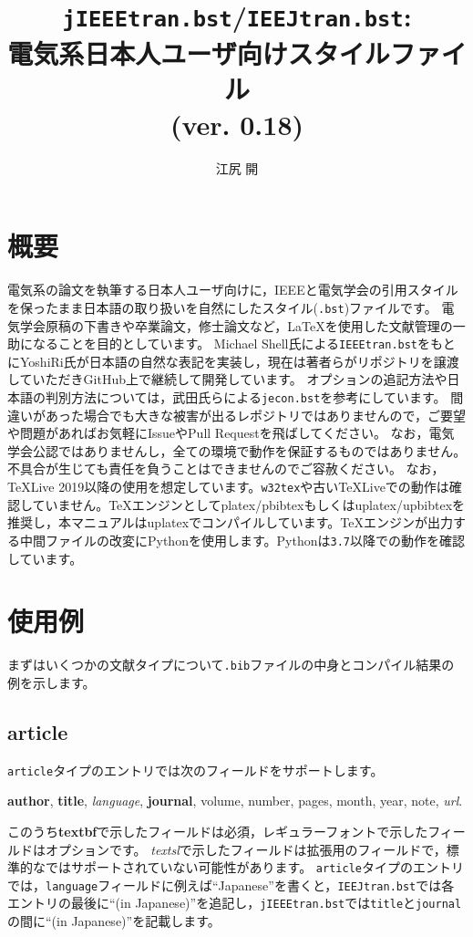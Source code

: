 \documentclass[10pt, a4paper, dvipdfmx, uplatex]{jsarticle} %
\title{\texttt{jIEEEtran.bst}/\texttt{IEEJtran.bst}:\\電気系日本人ユーザ向け\BibTeX スタイルファイル\\(ver. 0.18)}
\author{江尻 開}
\begin{document}
\maketitle
\tableofcontents



\section{概要}
\begin{bibunit}[jIEEEtran]

電気系の論文を執筆する日本人ユーザ向けに，IEEEと電気学会の引用スタイルを保ったまま日本語の取り扱いを自然にした\BibTeX スタイル(\texttt{.bst})ファイルです。
電気学会原稿の下書きや卒業論文，修士論文など，\LaTeX を使用した文献管理の一助になることを目的としています。
Michael Shell氏による\texttt{IEEEtran.bst}\cite{IEEEtran}をもとにYoshiRi氏が日本語の自然な表記を実装し，現在は著者らがリポジトリを譲渡していただきGitHub上\cite{jIEEEtran}で継続して開発しています。
オプションの追記方法や日本語の判別方法については，武田氏らによる\texttt{jecon.bst}\cite{jeconbst}を参考にしています。
間違いがあった場合でも大きな被害が出るレポジトリではありませんので，ご要望や問題があればお気軽にIssueやPull Requestを飛ばしてください。
なお，電気学会公認ではありませんし，全ての環境で動作を保証するものではありません。不具合が生じても責任を負うことはできませんのでご容赦ください。
なお，\TeX Live 2019以降の使用を想定しています。\texttt{w32tex}や古い\TeX Liveでの動作は確認していません。\TeX エンジンとしてplatex/pbibtexもしくはuplatex/upbibtexを推奨し，本マニュアルはuplatexでコンパイルしています。\TeX エンジンが出力する中間ファイルの改変にPythonを使用します。Pythonは\texttt{3.7}以降での動作を確認しています。

{\small \putbib[./ref]}
\end{bibunit}


\section{使用例}
まずはいくつかの文献タイプについて\texttt{.bib}ファイルの中身とコンパイル結果の例を示します。

\subsection{article}

\texttt{article}タイプのエントリでは次のフィールドをサポートします。
\begin{center}
\textbf{author}, \textbf{title}, \textsl{language}, \textbf{journal}, volume, number, pages, month, year, note, \textsl{url}.
\end{center}
このうち\textbf{textbf}で示したフィールドは必須，レギュラーフォントで示したフィールドはオプションです。
\textsl{textsl}で示したフィールドは拡張用のフィールドで，標準的な\BibTeX ではサポートされていない可能性があります。
\texttt{article}タイプのエントリでは，\texttt{language}フィールドに例えば``Japanese''を書くと，\texttt{IEEJtran.bst}では各エントリの最後に``(in Japanese)''を追記し，\texttt{jIEEEtran.bst}では\texttt{title}と\texttt{journal}の間に``(in Japanese)''を記載します。
\end{document}
